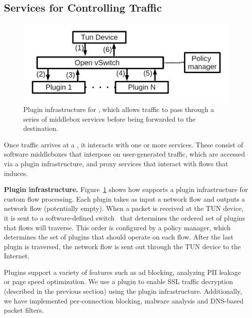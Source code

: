 \subsection{Services for Controlling Traffic}
\label{subsec:design_control}
\begin{figure}
\begin{center}
\includegraphics[width=\columnwidth]{figures/packet-monitoring-plugin.pdf}
\end{center}
\vspace{\postfigspace}
\caption{Plugin infrastructure for \platname, which allows traffic to pass through 
a series of middlebox services before being forwarded to the destination. }
\label{fig:packet-monitoring-solution}
\vspace{\postfigspace}
\end{figure}

Once traffic arrives at a \meddlebox, it interacts with one or more 
services. These consist of software middleboxes that interpose on 
user-generated traffic, which are accessed 
via a plugin infrastructure, and proxy services that interact with 
flows that \meddle induces.  

\noindent\textbf{Plugin infrastructure.} Figure~\ref{fig:packet-monitoring-solution} shows how 
\platname{} supports a plugin
infrastructure for custom flow processing. Each plugin takes as input a 
network flow and outputs a network flow (potentially empty). 
When a packet is received at the TUN
device, it is sent to a software-defined switch~\cite{Openvswitch} that 
determines the ordered set of plugins that flows will traverse. 
This order is configured by a policy manager, which determines 
the set of plugins that should operate on each flow. After the last 
plugin is traversed, the network flow is sent out through the TUN device 
to the Internet. 

Plugins support a variety of features such as ad blocking, 
analyzing PII leakage or page speed optimization. We 
 use a plugin to enable SSL traffic decryption (described in the previous section) using 
the \platname{} plugin infrastructure. Additionally, we have implemented 
per-connection blocking, malware analysis and DNS-based packet filters. 

